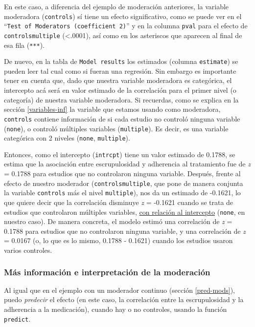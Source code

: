 \documentclass[
  bookmarksnumbered]{article}
\begin{document}
En este caso, a diferencia del ejemplo de moderación anteriores, la variable moderadora (\texttt{controls}) sí tiene un efecto significativo, como se puede ver en el ``\texttt{Test\ of\ Moderators\ (coefficient\ 2)}'' y en la columna \texttt{pval} para el efecto de \texttt{controlsmultiple} (\textless.0001), así como en los asteriscos que aparecen al final de esa fila (\texttt{***}).

De nuevo, en la tabla de \texttt{Model\ results} los estimados (columna \texttt{estimate}) se pueden leer tal cual como si fueran una regresión. Sin embargo es importante tener en cuenta que, dado que nuestra variable moderadora es categórica, el intercepto acá será en valor estimado de la correlación para el primer nivel (o categoría) de nuestra variable moderadora. Si recuerdas, como se explica en la sección \ref{variables-inf} la variable que estamos usando como moderadora, \texttt{controls} contiene información de si cada estudio no controló ninguna variable (\texttt{none}), o controló múltiples variables (\texttt{multiple}). Es decir, es una variable categórica con 2 niveles (\texttt{none}, \texttt{multiple}).

Entonces, como el intercepto (\texttt{intrcpt}) tiene un valor estimado de 0.1788, se estima que la asociación entre escrupulosidad y adherencia al tratamiento fue de \emph{z} = 0.1788 para estudios que no controlaron ninguna variable. Después, frente al efecto de nuestro moderador (\texttt{controlsmultiple}, que pone de manera conjunta la variable \texttt{controls} más el nivel \texttt{multiple}), nos da un estimado de -0.1621, lo que quiere decir que la correlación disminuye \emph{z} = -0.1621 cuando se trata de estudios que controlaron múltiples variables, \underline{con relación al intercepto} (\texttt{none}, en nuestro caso). De manera concreta, el modelo estimó una correlación de \emph{z} = 0.1788 para estudios que no controlaron ninguna variable, y una correlación de \emph{z} = 0.0167 (o, lo que es lo mismo, 0.1788 - 0.1621) cuando los estudios usaron varios controles.

\hypertarget{pred-mods2}{%
\subsubsection{Más información e interpretación de la moderación}\label{pred-mods2}}

Al igual que en el ejemplo con un moderador continuo (sección \ref{pred-mods}), puedo \emph{predecir} el efecto (en este caso, la correlación entre la escrupulosidad y la adherencia a la medicación), cuando hay o no controles, usando la función \texttt{predict}.
\end{document}
